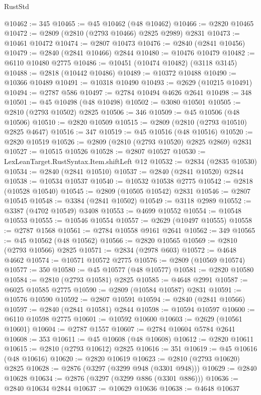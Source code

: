 \begin{lexlean}{RustStd}
\begin{coremodule}
@10462 := 345
@10465 := @45 @10462 (@48 @10462)
@10466 := @2820 @10465
@10472 := @2809 (@2810 (@2793 @10466) @2825 @2989) @2831
@10473 := @10461 @10472
@10474 := @2807 @10473
@10476 := @2840 (@2841 @10456)
@10479 := @2840 (@2841 @10466) @2844
@10480 := @10476 @10479
@10482 := @6110 @10480 @2775
@10486 := @10451 (@10474 @10482) (@3118 @3145)
@10488 := @2818 (@10442 @10486)
@10489 := @10372 @10488
@10490 := @10366 @10489
@10491 := @10318 @10490
@10493 := @2629 (@10215 @10491)
@10494 := @2787 @586
@10497 := @2784 @10494 @4626 @2641
@10498 := 348
@10501 := @45 @10498 (@48 @10498)
@10502 := @3080 @10501
@10505 := @2810 (@2793 @10502) @2825
@10506 := 346
@10509 := @45 @10506 (@48 @10506)
@10510 := @2820 @10509
@10515 := @2809 (@2810 (@2793 @10510) @2825 @4647)
@10516 := 347
@10519 := @45 @10516 (@48 @10516)
@10520 := @2820 @10519
@10526 := @2809 (@2810 (@2793 @10520) @2825 @2869) @2831
@10527 := @10515 @10526
@10528 := @2807 @10527
@10530 := LexLeanTarget.RustSyntax.Item.shiftLeft @12
@10532 := @2834 (@2835 @10530)
@10534 := @2840 (@2841 @10510)
@10537 := @2840 (@2841 @10520) @2844
@10538 := @10534 @10537
@10540 := @10532 @10538 @2775
@10542 := @2818 (@10528 @10540)
@10545 := @2809 (@10505 @10542) @2831
@10546 := @2807 @10545
@10548 := @3384 (@2841 @10502)
@10549 := @3118 @2989
@10552 := @3387 (@4702 @10549) @3408
@10553 := @4699 @10552
@10554 := @10548 @10553
@10555 := @10546 @10554
@10557 := @2629 (@10497 @10555)
@10558 := @2787 @1568
@10561 := @2784 @10558 @9161 @2641
@10562 := 349
@10565 := @45 @10562 (@48 @10562)
@10566 := @2820 @10565
@10569 := @2810 (@2793 @10566) @2825
@10571 := @2834 (@2978 @603)
@10572 := @4648 @4662
@10574 := @10571 @10572 @2775
@10576 := @2809 (@10569 @10574)
@10577 := 350
@10580 := @45 @10577 (@48 @10577)
@10581 := @2820 @10580
@10584 := @2810 (@2793 @10581) @2825
@10585 := @4648 @2991
@10587 := @6025 @10585 @2775
@10590 := @2809 (@10584 @10587) @2831
@10591 := @10576 @10590
@10592 := @2807 @10591
@10594 := @2840 (@2841 @10566)
@10597 := @2840 (@2841 @10581) @2844
@10598 := @10594 @10597
@10600 := @6110 @10598 @2775
@10601 := @10592 @10600
@10603 := @2629 (@10561 @10601)
@10604 := @2787 @1557
@10607 := @2784 @10604 @5784 @2641
@10608 := 353
@10611 := @45 @10608 (@48 @10608)
@10612 := @2820 @10611
@10615 := @2810 (@2793 @10612) @2825
@10616 := 351
@10619 := @45 @10616 (@48 @10616)
@10620 := @2820 @10619
@10623 := @2810 (@2793 @10620) @2825
@10628 := @2876 (@3297 (@3299 @948 (@3301 @948)))
@10629 := @2840 @10628
@10634 := @2876 (@3297 (@3299 @886 (@3301 @886)))
@10636 := @2840 @10634 @2844
@10637 := @10629 @10636
@10638 := @4648 @10637

\end{coremodule}
\end{lexlean}
